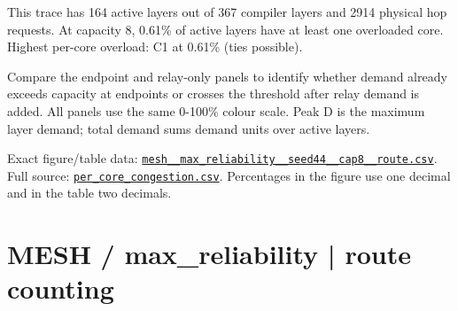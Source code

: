 \documentclass[10pt,a4paper]{article}
\begin{document}
This trace has 164 active layers out of 367 compiler layers and 2914 physical hop requests. At capacity 8, 0.61\% of active layers have at least one overloaded core. Highest per-core overload: C1 at 0.61\% (ties possible).\par
Compare the endpoint and relay-only panels to identify whether demand already exceeds capacity at endpoints or crosses the threshold after relay demand is added. All panels use the same 0-100\% colour scale. Peak D is the maximum layer demand; total demand sums demand units over active layers.\par
Exact figure/table data: \href{\detokenize{file:///home/dhruv-pansuriya/Documents/BTP/Compiler-Driven-ACE/output/pdf/qaoa_methods_congestion/tables/mesh__max_reliability__seed44__cap8__route.csv}}{\nolinkurl{mesh__max_reliability__seed44__cap8__route.csv}}. Full source: \href{\detokenize{file:///home/dhruv-pansuriya/Documents/BTP/Compiler-Driven-ACE/results/qaoa_2seed_2026-10-26/congestion/per_core_congestion.csv}}{\nolinkurl{per_core_congestion.csv}}. Percentages in the figure use one decimal and in the table two decimals.\par
\clearpage
\section*{MESH / max\_reliability | route counting}
\end{document}
